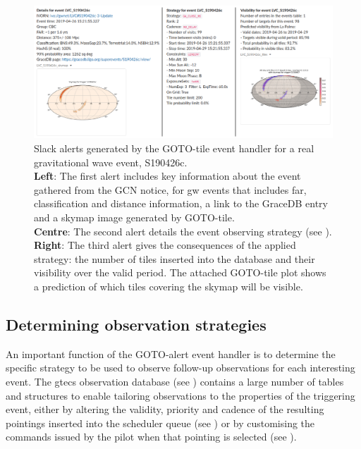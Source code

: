 \begin{colsection}
\begin{colsection}
\begin{figure}
\begin{center}
\includegraphics[width=\linewidth]{images/gototile_slack_side.png}
\end{center}
\caption[Slack alerts created by GOTO-tile for a GW event]{Slack alerts generated by the GOTO-tile event handler for a real gravitational wave event, S190426c.\\
\textbf{Left}: The first alert includes key information about the event gathered from the GCN notice, for \gls{gw} events that includes \gls{far}, classification and distance information, a link to the GraceDB entry and a skymap image generated by GOTO-tile.\\
\textbf{Centre}: The second alert details the event observing strategy (see ).\\
\textbf{Right}: The third alert gives the consequences of the applied strategy: the number of tiles inserted into the database and their visibility over the valid period. The attached GOTO-tile plot shows a prediction of which tiles covering the skymap will be visible.
}
\label{fig:gototile_slack}
\end{figure}

\end{colsection}


\newpage

\subsection{Determining observation strategies}
\label{sec:event_strategy}
\begin{colsection}

An important function of the GOTO-alert event handler is to determine the specific strategy to be used to observe follow-up observations for each interesting event. The \gls{gtecs} observation database (see ) contains a large number of tables and structures to enable tailoring observations to the properties of the triggering event, either by altering the validity, priority and cadence of the resulting pointings inserted into the scheduler queue (see ) or by customising the commands issued by the pilot when that pointing is selected (see ).


\end{colsection}
\end{colsection}
